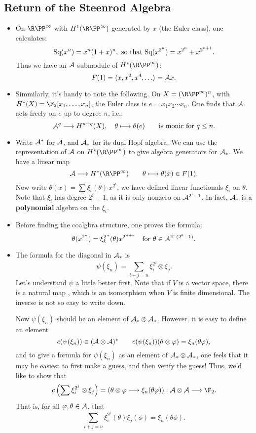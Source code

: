 \documentclass[11pt]{article}
\renewcommand{\Steen}{\calA}
\begin{document}
\subsection{Return of the Steenrod Algebra}
\begin{itemize}\squishlist
\item On $\RP^\infty$ with $H^1(\RP^\infty)$ generated by $x$ (the Euler class), one calculates:
\[\textup{Sq}(x^n)=x^n(1+x)^n,\textup{ so that }\textup{Sq}(x^{2^n})=x^{2^n}+x^{2^{n+1}}.\]
Thus we have an $\Steen$-submodule of $H^*(\RP^\infty)$:
\[F(1)=\langle x,x^2,x^4,\ldots\rangle=\Steen x.\]
\item Simmilarly, it's handy to note the following. {\small On $X=(\RP^\infty)^n$, with $H^*(X)=\F_2[x_1,\ldots,x_n]$, the Euler class is $e=x_1x_2\cdots x_n$. One finds that $\Steen$ acts freely on $e$ up to degree $n$, i.e.:
\[\Steen^q\to H^{n+q}(X),\quad \theta\mapsto \theta(e)\qquad \textup{is monic for $q\leq n$.}\]}
\item Write $\Steen^*$ for $\Steen$, and $\Steen_*$ for its dual Hopf algebra. We can use the representation of $\Steen$ on $H^*(\RP^\infty)$ to give algebra generators for $\Steen_*$. We have a linear map
\[\Steen\to H^*(\RP^\infty)\qquad \theta\mapsto \theta (x)\in F(1).\]
Now write $\theta (x)=\sum \xi_i(\theta)\,x^{2^i}$, we have defined linear functionals $\xi_i$ on $\theta$. Note that $\xi_i$ has degree $2^i-1$, as it is only nonzero on $\Steen^{2^i-1}$. In fact, $\Steen_*$ is a \textbf{polynomial} algebra on the $\xi_i$.
\item Before finding the coalgbra structure, one proves the formula:
\[\theta (x^{2^n})=\xi_k^{2^n}(\theta)x^{2^{n+k}}\textup{\quad for $\theta\in\Steen^{2^n(2^k-1)}$.}\]
\item The formula for the diagonal in $\Steen_*$ is 
\[\psi(\xi_n)=\sum_{i+j=n}\xi_i^{2^j}\otimes \xi_j.\]
Let's understand $\psi$ a little better first. Note that if $V$ is a vector space, there is a natural map , which is an isomorphism when $V$ is finite dimensional. The inverse is not so easy to write down.

\INDENT Now $\psi(\xi_n)$ should be an element of $\Steen_*\otimes \Steen_*$. However, it is easy to define an element 
\[c(\psi(\xi_n))\in(\Steen\otimes \Steen)^*\qquad c(\psi(\xi_n))(\theta\otimes\phi)=\xi_n(\theta\phi),\]
and to give a formula for $\psi(\xi_n)$ as an element of $\Steen_*\otimes \Steen_*$, one feels that it may be easiest to first make a guess, and then verify the guess! 
Thus, we'd like to show that 
\[c\left(\sum \xi_i^{2^j}\otimes \xi_j\right)=\left(\theta\otimes\phi\mapsto \xi_n(\theta\phi)\right):\Steen\otimes \Steen\to\F_2.\]
That is, for all $\phi,\theta\in\Steen$, that
\[\sum_{i+j=n} \xi_i^{2^j}(\theta)\xi_j(\phi)=\xi_n(\theta\phi).\]

\end{itemize}
\end{document}
